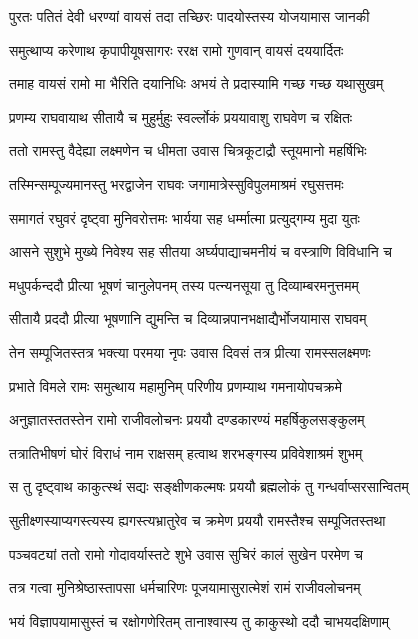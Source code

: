 \twolineshloka
{पुरतः पतितं देवी धरण्यां वायसं तदा}
{तच्छिरः पादयोस्तस्य योजयामास जानकी}%

\twolineshloka
{समुत्थाप्य करेणाथ कृपापीयूषसागरः}
{ररक्ष रामो गुणवान् वायसं दययार्दितः}%

\twolineshloka
{तमाह वायसं रामो मा भैरिति दयानिधिः}
{अभयं ते प्रदास्यामि गच्छ गच्छ यथासुखम्}%

\twolineshloka
{प्रणम्य राघवायाथ सीतायै च मुहुर्मुहुः}
{स्वर्ल्लोकं प्रययावाशु राघवेण च रक्षितः}%

\twolineshloka
{ततो रामस्तु वैदेह्या लक्ष्मणेन च धीमता}
{उवास चित्रकूटाद्रौ स्तूयमानो महर्षिभिः}%

\twolineshloka
{तस्मिन्सम्पूज्यमानस्तु भरद्वाजेन राघवः}
{जगामात्रेस्सुविपुलमाश्रमं रघुसत्तमः}%

\twolineshloka
{समागतं रघुवरं दृष्ट्वा मुनिवरोत्तमः}
{भार्यया सह धर्म्मात्मा प्रत्युद्गम्य मुदा युतः}%

\twolineshloka
{आसने सुशुभे मुख्ये निवेश्य सह सीतया}
{अर्घ्यपाद्याचमनीयं च वस्त्राणि विविधानि च}%

\twolineshloka
{मधुपर्कन्ददौ प्रीत्या भूषणं चानुलेपनम्}
{तस्य पत्न्यनसूया तु दिव्याम्बरमनुत्तमम्}%

\twolineshloka
{सीतायै प्रददौ प्रीत्या भूषणानि द्युमन्ति च}
{दिव्यान्नपानभक्षाद्यैर्भोजयामास राघवम्}%

\twolineshloka
{तेन सम्पूजितस्तत्र भक्त्या परमया नृपः}
{उवास दिवसं तत्र प्रीत्या रामस्सलक्ष्मणः}%

\twolineshloka
{प्रभाते विमले रामः समुत्थाय महामुनिम्}
{परिणीय प्रणम्याथ गमनायोपचक्रमे}%

\twolineshloka
{अनुज्ञातस्ततस्तेन रामो राजीवलोचनः}
{प्रययौ दण्डकारण्यं महर्षिकुलसङ्कुलम्}%

\twolineshloka
{तत्रातिभीषणं घोरं विराधं नाम राक्षसम्}
{हत्वाथ शरभङ्गस्य प्रविवेशाश्रमं शुभम्}%

\twolineshloka
{स तु दृष्ट्वाथ काकुत्स्थं सद्यः सङ्क्षीणकल्मषः}
{प्रययौ ब्रह्मलोकं तु गन्धर्वाप्सरसान्वितम्}%

\twolineshloka
{सुतीक्ष्णस्याप्यगस्त्यस्य ह्यगस्त्यभ्रातुरेव च}
{क्रमेण प्रययौ रामस्तैश्च सम्पूजितस्तथा}%

\twolineshloka
{पञ्चवट्यां ततो रामो गोदावर्यास्तटे शुभे}
{उवास सुचिरं कालं सुखेन परमेण च}%

\twolineshloka
{तत्र गत्वा मुनिश्रेष्ठास्तापसा धर्मचारिणः}
{पूजयामासुरात्मेशं रामं राजीवलोचनम्}%

\twolineshloka
{भयं विज्ञापयामासुस्तं च रक्षोगणेरितम्}
{तानाश्वास्य तु काकुस्थो ददौ चाभयदक्षिणाम्}%

